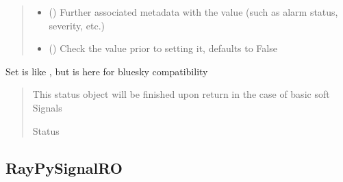 \documentclass[letterpaper,10pt,english]{sphinxmanual}
\begin{document}
\begin{fulllineitems}
\begin{fulllineitems}
\begin{quote}
\begin{description}
\begin{itemize}
\item {} 
\sphinxAtStartPar
{} (\sphinxstyleliteralemphasis{\sphinxupquote{, }}) \textendash{} Further associated metadata with the value (such as alarm status,
severity, etc.)

\item {} 
\sphinxAtStartPar
{} (\sphinxstyleliteralemphasis{\sphinxupquote{, }}) \textendash{} Check the value prior to setting it, defaults to False

\end{itemize}

\end{description}\end{quote}

\end{fulllineitems}


\begin{fulllineitems}
\label{\detokenize{API:raypyng_bluesky.signal.RayPySignal.set}}
\pysigstartsignatures
{}
\pysigstopsignatures
\sphinxAtStartPar
Set is like , but is here for bluesky compatibility
\begin{quote}\begin{description}
\sphinxAtStartPar
{} \textendash{} This status object will be finished upon return in the
case of basic soft Signals

\sphinxAtStartPar
Status

\end{description}\end{quote}

\end{fulllineitems}


\end{fulllineitems}



\subsection{RayPySignalRO}
\label{\detokenize{API:raypysignalro}}
\end{document}
